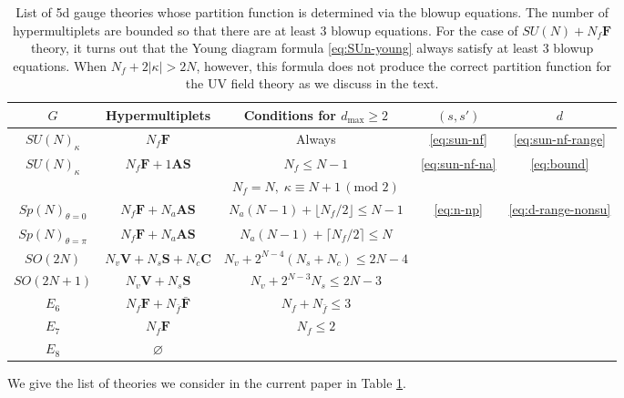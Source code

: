 \documentclass[letterpaper, 11pt]{article}
\begin{document}
{\begin{table}[t!]
  \centering
  \begin{tabular}{|c|c|c|c|c|}
    \hline
    $G$ & Hypermultiplets & Conditions for $d_{\text{max}}\ge 2$ &   $(s, s')$ & $d$ \\
    \hline \hline
    $SU(N)_\kappa$ & $N_f \mathbf{F}$ & Always  &    \eqref{eq:sun-nf} & \eqref{eq:sun-nf-range} \\
    \cline{1-5}
    \multirow{2}{*}{$SU(N)_\kappa$} & \multirow{2}{*}{$N_f \mathbf{F}+1\textbf{AS}$} & $N_f \le N-1$ &    \multirow{2}{*}{\eqref{eq:sun-nf-na}} & \multirow{2}{*}{\eqref{eq:bound}} \\\cline{3-3}
	& & $N_f=N,\; \kappa\equiv N+1\,(\text{mod } 2)$ & & \\
    \cline{1-5}
    $Sp(N)_{\theta=0}$ & $N_f\mathbf{F}+N_a \mathbf{AS}$ & $N_a(N-1)+\lfloor N_f/2\rfloor\leq  N-1$ &   \multirow{7}{*}{\eqref{eq:n-np}}& \multirow{7}{*}{\eqref{eq:d-range-nonsu}} \\
    \cline{1-3}
    $Sp(N)_{\theta=\pi}$ & $N_f\mathbf{F}+N_a\mathbf{AS}$ & $N_a(N-1)+\lceil N_f/2\rceil\le  N$ & & \\
    \cline{1-3}
    $SO(2N)$ & $N_v\mathbf{V}+N_s\mathbf{S}+N_c\mathbf{C}$ & $N_v+2^{N-4}(N_s+N_c) \le  2N-4$ &  & \\
    \cline{1-3}
    $SO(2N+1)$ & $N_v\mathbf{V}+N_s\mathbf{S}$ & $N_v+2^{N-3}N_s \le 2 N-3$ & &   \\
    \cline{1-3}
    $E_6$ & $N_f\mathbf{F}+N_{\bar{f}}\mathbf{\bar{F}}$ & $N_f+N_{\bar{f}} \le 3 $ & &   \\
    \cline{1-3}
    $E_7$ & $N_f\mathbf{F}$ & $N_f \le 2$ & &   \\
    \cline{1-3}
    $E_8$ & $\varnothing$ &  & &   \\
    \hline
    \end{tabular}
    \caption{List of 5d gauge theories whose partition function is determined via the blowup equations. The number of hypermultiplets are bounded so that there are at least 3 blowup equations. 
    For the case of $SU(N) + N_f \mathbf{F}$ theory, it turns out that the Young diagram formula \eqref{eq:SUn-young} always satisfy at least 3 blowup equations. When $N_f + 2|\kappa| > 2N$, however, this formula does not produce the correct partition function for the UV field theory as we discuss in the text.}
    \label{tbl:list}
\end{table}
We give the list of theories we consider in the current paper in Table \ref{tbl:list}. 




}
\end{document}
